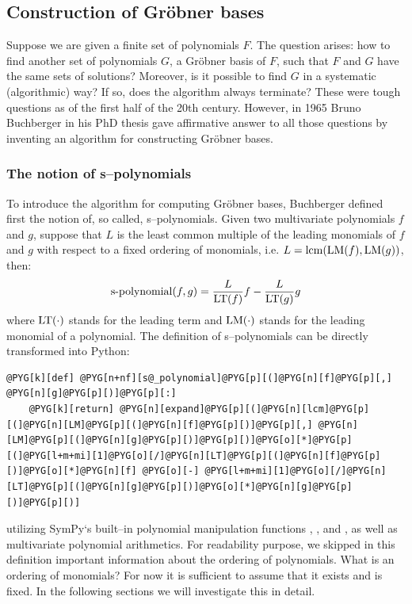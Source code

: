\subsection{Construction of Gröbner bases}

Suppose we are given a finite set of polynomials $F$. The question arises: how to find another set
of polynomials $G$, a Gröbner basis of $F$, such that $F$ and $G$ have the same sets of solutions?
Moreover, is it possible to find $G$ in a systematic (algorithmic) way? If so, does the algorithm
always terminate? These were tough questions as of the first half of the 20th century. However, in
1965 Bruno Buchberger in his PhD thesis gave affirmative answer to all those questions by inventing
an algorithm for constructing Gröbner bases.


\subsubsection{The notion of s--polynomials}

To introduce the algorithm for computing Gröbner bases, Buchberger defined first the notion of,
so called, s--polynomials. Given two multivariate polynomials $f$ and $g$, suppose that $L$ is the
least common multiple of the leading monomials of $f$ and $g$ with respect to a fixed ordering of
monomials, i.e. $L = \operatorname{lcm}(\operatorname{LM}(f), \operatorname{LM}(g))$, then:
\begin{gather}
\begin{split}\operatorname{s-polynomial}(f, g) = \frac{L}{\operatorname{LT}(f)} f - \frac{L}{\operatorname{LT}(g)} g\end{split}\notag
\end{gather}
where $\operatorname{LT}(\cdot)$ stands for the leading term and $\operatorname{LM}(\cdot)$ stands for the leading monomial of
a polynomial. The definition of s--polynomials can be directly transformed into Python:

\begin{Verbatim}[commandchars=@\[\]]
@PYG[k][def] @PYG[n+nf][s@_polynomial]@PYG[p][(]@PYG[n][f]@PYG[p][,] @PYG[n][g]@PYG[p][)]@PYG[p][:]
    @PYG[k][return] @PYG[n][expand]@PYG[p][(]@PYG[n][lcm]@PYG[p][(]@PYG[n][LM]@PYG[p][(]@PYG[n][f]@PYG[p][)]@PYG[p][,] @PYG[n][LM]@PYG[p][(]@PYG[n][g]@PYG[p][)]@PYG[p][)]@PYG[o][*]@PYG[p][(]@PYG[l+m+mi][1]@PYG[o][/]@PYG[n][LT]@PYG[p][(]@PYG[n][f]@PYG[p][)]@PYG[o][*]@PYG[n][f] @PYG[o][-] @PYG[l+m+mi][1]@PYG[o][/]@PYG[n][LT]@PYG[p][(]@PYG[n][g]@PYG[p][)]@PYG[o][*]@PYG[n][g]@PYG[p][)]@PYG[p][)]
\end{Verbatim}
\noindent
utilizing SymPy`s built--in polynomial manipulation functions , , 
and , as well as multivariate polynomial arithmetics. For readability purpose, we
skipped in this definition important information about the ordering of polynomials. What is an
ordering of monomials? For now it is sufficient to assume that it exists and is fixed. In the
following sections we will investigate this in detail.


